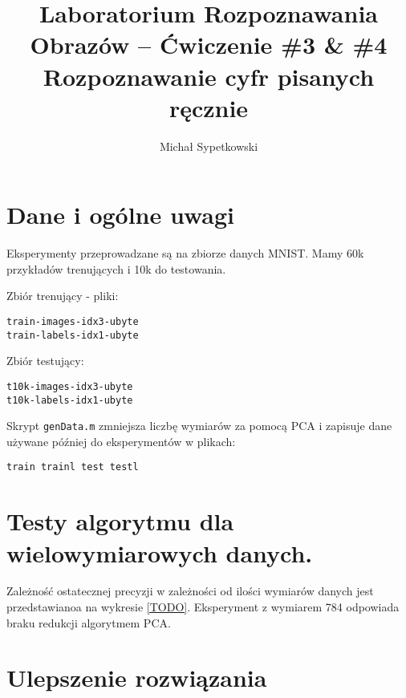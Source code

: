 \documentclass[a4paper]{article}
\begin{document}
\title{ Laboratorium Rozpoznawania Obrazów – Ćwiczenie \#3 \& \#4 Rozpoznawanie cyfr pisanych ręcznie }


\author{Michał Sypetkowski}
\maketitle










\section{Dane i ogólne uwagi}
Eksperymenty przeprowadzane są na zbiorze danych MNIST. 
Mamy 60k przykładów trenujących i 10k do testowania.

Zbiór trenujący - pliki:
\begin{verbatim}
train-images-idx3-ubyte
train-labels-idx1-ubyte
\end{verbatim}

Zbiór testujący:
\begin{verbatim}
t10k-images-idx3-ubyte
t10k-labels-idx1-ubyte
\end{verbatim}

Skrypt \texttt{genData.m} zmniejsza liczbę wymiarów za pomocą PCA
i zapisuje dane używane później do eksperymentów w plikach:
\begin{verbatim}
train trainl test testl
\end{verbatim}

\section{Testy algorytmu dla wielowymiarowych danych.}

Zależność ostatecznej precyzji w zależności od ilości wymiarów danych jest przedstawianoa na wykresie \ref{TODO}.
Eksperyment z wymiarem 784 odpowiada braku redukcji algorytmem PCA. %


\section{Ulepszenie rozwiązania}
\end{document}
